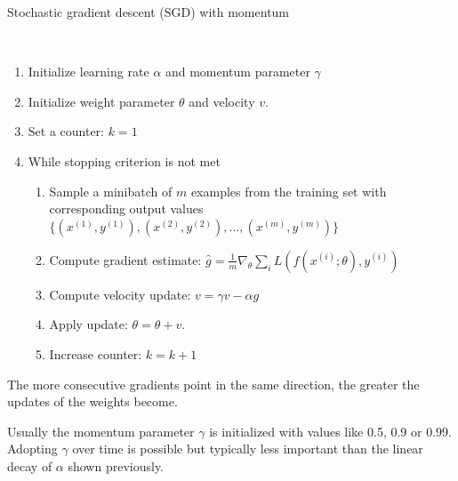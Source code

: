 \begin{algorithm}
	\caption{Stochastic gradient descent (SGD) with momentum \cite{goodfellow2016deep}}\label{alg:momentum}
	\begin{algorithmic}
		\\
		\begin{enumerate}
			\item Initialize learning rate $\alpha$ and momentum parameter $\gamma$
			\item Initialize weight parameter $\theta$ and velocity $v$.
			\item Set a counter: $k = 1$
			\item While stopping criterion is not met
			\begin{enumerate}[label=\emph{\alph*})]
				\item Sample a minibatch of $m$ examples from the training set with corresponding output values
				$\{(x^{(1)}, y^{(1)}), (x^{(2)}, y^{(2)}), ..., (x^{(m)}, y^{(m)})\}$
				\item Compute gradient estimate: $\hat{g} = \frac{1}{m} \nabla_\theta \sum_i L(f(x^{(i)};\theta), y^{(i)})$
				\item Compute velocity update: $v = \gamma v - \alpha g$
				\item Apply update: $\theta = \theta + v$.
				\item Increase counter: $k = k + 1$
			\end{enumerate}
		\end{enumerate}
	\end{algorithmic}
\end{algorithm}

\begin{remark}
	The more consecutive gradients point in the same direction, the greater the updates of the weights become. 
\end{remark}

\begin{remark}
	Usually the momentum parameter $\gamma$ is initialized with values like 0.5, 0.9 or 0.99. Adopting $\gamma$ over time is possible but typically less important than the linear decay of $\alpha$ shown previously. 
\end{remark}

